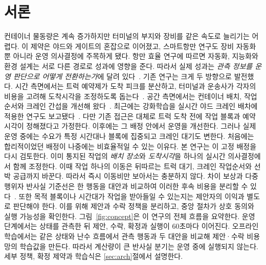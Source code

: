 \documentclass{llncs}
\begin{document}
\section{서론}
\label{sec:intro}
컨테이너 물동량은 계속 증가하지만 터미널의 부지와 장비를 같은 속도로 늘리기는 어렵다.
이 제약은 야드와 게이트의 혼잡으로 이어졌고, 스마트항만 연구도 장비 자동화뿐 아니라
운영 의사결정에 주목하게 됐다. 항만 효율 연구에 따르면 자동화, 지능화와 환경 설계는
서로 다른 경로로 성과에 영향을 준다. 따라서 실제 성과는 \emph{관측 정보를 운영 판단으로
어떻게 전환하는가}에 달려 있다~\cite{ref1}. 기존 연구는 크게 두 방향으로 발전했다.
시간 측면에서는 트럭 예약제가 도착 피크를 분산하고, 터미널과 운송사가 각자의 비용을
고려해 도착시각을 조정하도록 돕는다~\cite{ref4,ref6}. 공간 측면에서는 컨테이너 배치,
작업순서와 크레인 간섭을 개선해 왔다~\cite{ref7,ref8,ref9,ref16}. 최근에는 강화학습을
실시간 야드 크레인 배차에 적용한 연구도 보고됐다~\cite{ref19}.
다만 기존 접근은 대체로 트럭 도착 전에 작업 블록과 예약시각이 정해졌다고 가정한다.
이후에는 그 배정 안에서 운영을 개선한다. 그러나 실제 운영 중에는 수요가 특정 시간대나
블록에 집중되고 크레인 대기도 변한다. 처음에는 합리적이었던 배정이 나중에는 비효율적일
수 있는 이유다. 본 연구는 이 고정 배정을 다시 검토한다. 이미 통지된 작업의 \emph{배치
장소}와 \emph{도착시각}을 하나의 실시간 의사결정에서 함께 조정한다. 이때 작업 하나의
이동은 뒤따르는 트럭 대기, 크레인 작업순서와 선박 공급까지 바꾼다. 따라서 즉시 이동비만
보아서는 충분하지 않다. 차이 보상과 다중 행위자 반사실 기준선은 한 행동을 대안과
비교하여 이러한 후속 비용을 분리할 수 있다~\cite{ref10,ref11}. 또한 목적 블록이나
시간대가 작업을 받아들일 수 있는지는 제안자의 이익과 별도로 판단해야 한다. 이를 위해
제안과 수락 정책을 분리하고, 중앙 절차가 상호 동의와 실행 가능성을 확인한다.
그림~\ref{fig:concept}은 이 연구의 전체 흐름을 요약한다. 운영 단계에서는 상태를 관측한
뒤 제안, 수락, 확정과 실행이 60초마다 이어진다. 오프라인 학습에서는 같은 상태와 난수
흐름에서 관측 행동과 두 대안을 비교해 제안·수락 비용망의 학습값을 만든다. 따라서 계산량이
큰 반사실 분기는 운영 중에 실행되지 않는다. 세부 정책, 확정 제약과 학습식은
\ref{sec:arch}절에서 설명한다.
\end{document}
